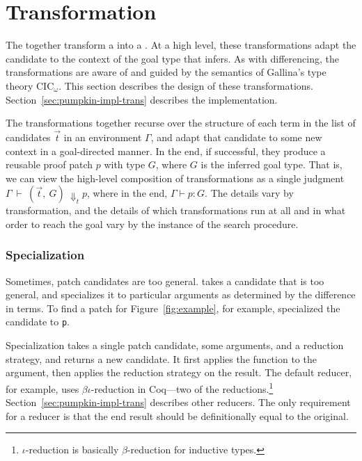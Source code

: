 \section{Transformation}
\label{sec:pumpkin-trans}

The  together transform a  into a .
At a high level, these transformations adapt the candidate to the context of the goal type that \sysname infers.
As with differencing, the transformations are aware of and guided by the semantics of Gallina's type theory CIC$_{\omega}$.
This section describes the design of these transformations.
Section~\ref{sec:pumpkin-impl-trans} describes the implementation.

The transformations together recurse over the structure of each term in the list of candidates $\vec{t}$ in an environment $\Gamma$,
and adapt that candidate to some new context in a goal-directed manner.
In the end, if successful, they produce a reusable proof patch $p$ with type $G$, where $G$ is the inferred goal type.
That is, we can view the high-level composition of transformations as a single judgment
$\Gamma\ \vdash\ (\vec{t},\ G)\ \Downarrow_{t} p$, where in the end, $\Gamma \vdash p : G$. 
The details vary by transformation,
and the details of which transformations run at all and in what order to reach the goal vary by the instance
of the search procedure.


\subsubsection*{Specialization}
Sometimes, patch candidates are too general.
 takes a candidate that is too general,
and specializes it to particular arguments as determined by the difference in terms.
To find a patch for Figure~\ref{fig:example}, for example, \sysname
specialized the candidate to \lstinline{p}.

Specialization takes a single patch candidate, some arguments, and a reduction strategy, and returns a new candidate.
It first applies the function to the argument, then applies the reduction strategy on the result.
The default reducer, for example, uses $\beta\iota$-reduction in Coq---two of the  reductions.\footnote{$\iota$-reduction is basically $\beta$-reduction for inductive types.}
Section~\ref{sec:pumpkin-impl-trans} describes other reducers.
The only requirement for a reducer is that the end result should be definitionally equal to the original.

